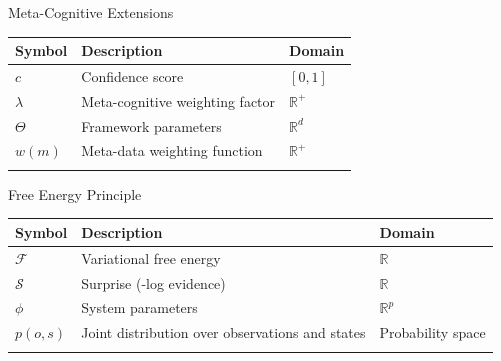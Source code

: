 \documentclass[
  ignorenonframetext,
]{beamer}
\newcounter{none} %
\begin{document}
\begin{frame}{Meta-Cognitive Extensions}
\protect{}\label{meta-cognitive-extensions}
{\def\LTcaptype{none} %
\begin{longtable}[]{@{}lll@{}}
\toprule\noalign{}
Symbol & Description & Domain \\
\midrule\noalign{}
\endhead
\(c\) & Confidence score & \([0,1]\) \\
\(\lambda\) & Meta-cognitive weighting factor & \(\mathbb{R}^+\) \\
\(\Theta\) & Framework parameters & \(\mathbb{R}^d\) \\
\(w(m)\) & Meta-data weighting function & \(\mathbb{R}^+\) \\
\bottomrule\noalign{}
\end{longtable}
}
\end{frame}

\begin{frame}{Free Energy Principle}
\protect{}\label{free-energy-principle}
{\def\LTcaptype{none} %
\begin{longtable}[]{@{}
  >{\raggedright\arraybackslash}p{}
  >{\raggedright\arraybackslash}p{}
  >{\raggedright\arraybackslash}p{}@{}}
\toprule\noalign{}
\begin{minipage}[b]{\linewidth}\raggedright
Symbol
\end{minipage} & \begin{minipage}[b]{\linewidth}\raggedright
Description
\end{minipage} & \begin{minipage}[b]{\linewidth}\raggedright
Domain
\end{minipage} \\
\midrule\noalign{}
\endhead
\(\mathcal{F}\) & Variational free energy & \(\mathbb{R}\) \\
\(\mathcal{S}\) & Surprise (-log evidence) & \(\mathbb{R}\) \\
\(\phi\) & System parameters & \(\mathbb{R}^p\) \\
\(p(o,s)\) & Joint distribution over observations and states &
Probability space \\
\bottomrule\noalign{}
\end{longtable}
}
\end{frame}
\end{document}
